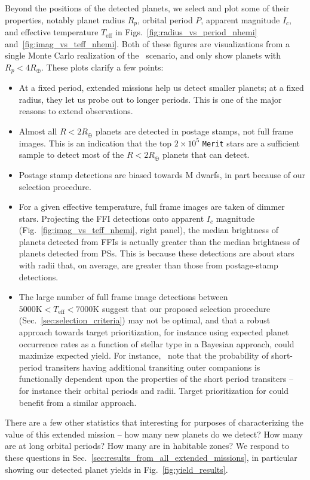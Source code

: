 Beyond the positions of the detected planets, we select and plot some of their properties, notably planet radius $R_p$, orbital period $P$, apparent magnitude $I_c$, and effective temperature $T_\mathrm{eff}$ in Figs.~\ref{fig:radius_vs_period_nhemi} and~\ref{fig:imag_vs_teff_nhemi}.
Both of these figures are visualizations from a single Monte Carlo realization of the \nhemi\ scenario, and only show planets with $R_p < 4R_\oplus$.
These plots clarify a few points:
\begin{itemize}
	\item At a fixed period, extended missions help us detect smaller planets; at a fixed radius, they let us probe out to longer periods. This is one of the major reasons to extend \tesss observations.
	\item Almost all $R<2R_\oplus$ planets are detected in postage stamps, not full frame images. This is an indication that the top $2\times10^5$ \texttt{Merit} stars are a sufficient sample to detect most of the $R<2R_\oplus$ planets that \tess can detect.
	\item Postage stamp detections are biased towards M dwarfs, in part because of our selection procedure.
	\item For a given effective temperature, full frame images are taken of dimmer stars. Projecting the FFI detections onto apparent $I_c$ magnitude (Fig.~\ref{fig:imag_vs_teff_nhemi}, right panel), the median brightness of planets detected from FFIs is actually greater than the median brightness of planets detected from PSs. This is because these detections are about stars with radii that, on average, are greater than those from postage-stamp detections.
	\item The large number of full frame image detections between $5000\mathrm{K} < T_\mathrm{eff} < 7000\mathrm{K}$ suggest that our proposed selection procedure (Sec.~\protect\ref{sec:selection_criteria}) may not be optimal, and that a robust approach towards target prioritization, for instance using expected planet occurrence rates as a function of stellar type in a Bayesian approach, could maximize \tesss expected yield. 
	For instance,~\protect\citet{kipping_transit_2016} note that the probability of short-period transiters having additional transiting outer companions is functionally dependent upon the properties of the short period transiters -- for instance their orbital periods and radii.
	Target prioritization for \tess could benefit from a similar approach.
\end{itemize}

There are a few other statistics that interesting for purposes of characterizing the value of this extended mission -- how many new planets do we detect? How many are at long orbital periods? How many are in habitable zones? We respond to these questions in Sec.~\ref{sec:results_from_all_extended_missions}, in particular showing our detected planet yields in Fig.~\ref{fig:yield_results}.